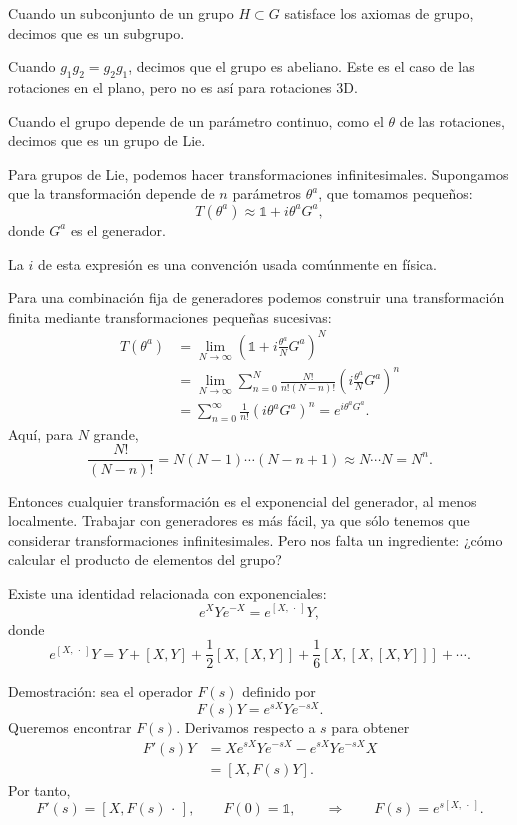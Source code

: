 \documentclass[11pt,a4paper]{article}
\newcommand{\concept}[1]{\textcolor{concept-green}{#1}}
\begin{document}
Cuando un subconjunto de un grupo $H\subset G$ satisface los axiomas de grupo, decimos que es un \concept{subgrupo}.

Cuando $g_1g_2=g_2g_1$, decimos que el grupo es \concept{abeliano}. Este es el caso de las rotaciones en el plano, pero no es así para rotaciones 3D.

Cuando el grupo depende de un parámetro continuo, como el $\theta$ de las rotaciones, decimos que es un \concept{grupo de Lie}.

Para grupos de Lie, podemos hacer transformaciones infinitesimales. Supongamos que la transformación depende de $n$ parámetros $\theta^a$, que tomamos pequeños:
\[
  T(\theta^a)\approx\mathbb{1}+i\theta^aG^a,
\]
donde $G^a$ es el generador.

La $i$ de esta expresión es una convención usada comúnmente en física.

Para una combinación fija de generadores podemos construir una transformación finita mediante transformaciones pequeñas sucesivas:
\begin{align*}
  T(\theta^a)
  &=\lim_{N\to\infty}
  \left(\mathbb{1}+i\frac{\theta^a}{N}G^a\right)^N \\
  &=\lim_{N\to\infty}
  \sum_{n=0}^N
  \frac{N!}{n!(N-n)!}
  \left(i\frac{\theta^a}{N}G^a\right)^n \\
  &=\sum_{n=0}^\infty\frac1{n!}(i\theta^aG^a)^n
  =e^{i\theta^aG^a}.
\end{align*}
Aquí, para $N$ grande,
\[
  \frac{N!}{(N-n)!}
  =N(N-1)\cdots(N-n+1)
  \approx N\cdots N
  =N^n.
\]

Entonces cualquier transformación es el exponencial del generador, al menos localmente. Trabajar con generadores es más fácil, ya que sólo tenemos que considerar transformaciones infinitesimales. Pero nos falta un ingrediente: ¿cómo calcular el producto de elementos del grupo?

Existe una identidad relacionada con exponenciales:
\[
  e^XYe^{-X}=e^{[X,\,\cdot\,]}Y,
\]
donde
\[
  e^{[X,\,\cdot\,]}Y
  =Y+[X,Y]+\frac12[X,[X,Y]]
  +\frac16[X,[X,[X,Y]]]+\cdots.
\]

Demostración: sea el operador $F(s)$ definido por
\[
  F(s)Y=e^{sX}Ye^{-sX}.
\]
Queremos encontrar $F(s)$. Derivamos respecto a $s$ para obtener
\begin{align*}
  F'(s)Y
  &=Xe^{sX}Ye^{-sX}-e^{sX}Ye^{-sX}X \\
  &=[X,F(s)Y].
\end{align*}
Por tanto,
\[
  F'(s)=[X,F(s)\,\cdot\,],
  \qquad F(0)=\mathbb{1},
  \qquad\Longrightarrow\qquad
  F(s)=e^{s[X,\,\cdot\,]}.
\]
\end{document}
